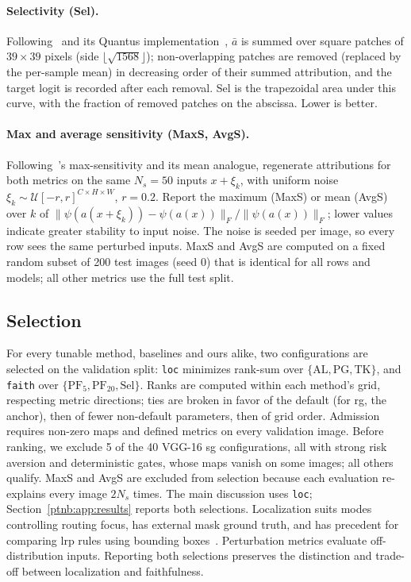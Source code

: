 \paragraph{Selectivity (Sel).}
Following~\textcite{Montavon2018} and its Quantus implementation~\parencite{Hedstrom2023}, $\bar{a}$ is summed over square patches of $39{\times}39$ pixels (side $\lfloor\sqrt{1568}\rfloor$); non-overlapping patches are removed (replaced by the per-sample mean) in decreasing order of their summed attribution, and the target logit is recorded after each removal. Sel is the trapezoidal area under this curve, with the fraction of removed patches on the abscissa. Lower is better.

\paragraph{Max and average sensitivity (MaxS, AvgS).} Following~\textcite{Yeh2019}'s max-sensitivity and its mean analogue, regenerate attributions for both metrics on the same $N_s = 50$ inputs $x + \xi_k$, with uniform noise $\xi_k \sim \mathcal{U}[-r, r]^{C \times H
    \times W}$, $r = 0.2$. Report the maximum (MaxS) or mean (AvgS) over $k$ of $\|\psi(a(x+\xi_k)) - \psi(a(x))\|_F / \|\psi(a(x))\|_F$; lower values indicate greater stability to input noise. The noise is seeded per image, so every row sees the same perturbed inputs. MaxS and AvgS are computed on a fixed random subset of 200 test images (seed 0) that is identical for all rows and models; all other metrics use the full test split.

\subsection{Selection}\label{ptnb:app:selection}

For every tunable method, baselines and ours alike, two configurations are selected on the validation split: \texttt{loc} minimizes rank-sum over $\{\text{AL}, \text{PG}, \text{TK}\}$, and \texttt{faith} over $\{\text{PF}_5, \text{PF}_{20}, \text{Sel}\}$. Ranks are computed within each method's grid, respecting metric directions; ties are broken in favor of the default (for \ac{rg}, the anchor), then of fewer non-default parameters, then of grid order. Admission requires non-zero maps and defined metrics on every validation image. Before ranking, we exclude 5 of the 40 VGG-16 \ac{sg} configurations, all with strong risk aversion and deterministic gates, whose maps vanish on some images; all others qualify. MaxS and AvgS are excluded from selection because each evaluation re-explains every image $2N_s$ times. The main discussion uses \texttt{loc}; Section~\ref{ptnb:app:results} reports both selections. Localization suits modes controlling routing focus, has external mask ground truth, and has precedent for comparing \ac{lrp} rules using bounding boxes~\parencite{Kohlbrenner2020}. Perturbation metrics evaluate off-distribution inputs. Reporting both selections preserves the distinction and trade-off between localization and faithfulness.

